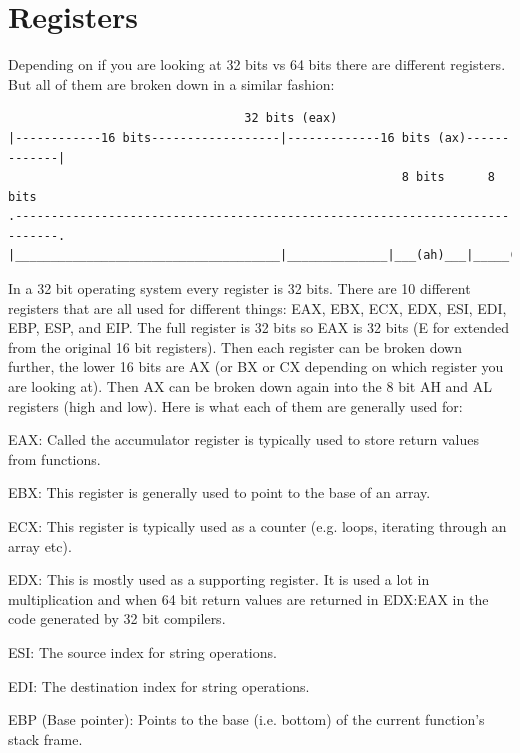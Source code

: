 \documentclass{report}
\begin{document}
\section{Registers}
Depending on if you are looking at 32 bits vs 64 bits there are different registers.  But all of them are broken down in a similar fashion:
\begin{verbatim}
                                 32 bits (eax)
|------------16 bits------------------|-------------16 bits (ax)-------------|
                                                       8 bits      8 bits 
.----------------------------------------------------------------------------.
|_____________________________________|______________|___(ah)___|_____(al)___|
\end{verbatim}
In a 32 bit operating system every register is 32 bits.  There are 10 different registers that are all used for different things: EAX, EBX, ECX, EDX, ESI, EDI, EBP, ESP, and EIP.  The full register is 32 bits so EAX is 32 bits (E for extended from the original 16 bit registers).  Then each register can be broken down further, the lower 16 bits are AX (or BX or CX depending on which register you are looking at).  Then AX can be broken down again into the 8 bit AH and AL registers (high and low).  Here is what each of them are generally used for:

EAX: Called the accumulator register is typically used to store return values from functions.\newline

EBX: This register is generally used to point to the base of an array.\newline

ECX: This register is typically used as a counter (e.g. loops, iterating through an array etc).\newline

EDX: This is mostly used as a supporting register. It is used a lot in multiplication and when 64 bit return values are returned in EDX:EAX in the code generated by 32 bit compilers.\newline

ESI: The source index for string operations.\newline

EDI: The destination index for string operations.\newline

EBP (Base pointer): Points to the base (i.e. bottom) of the current function’s stack frame.\newline
\end{document}
